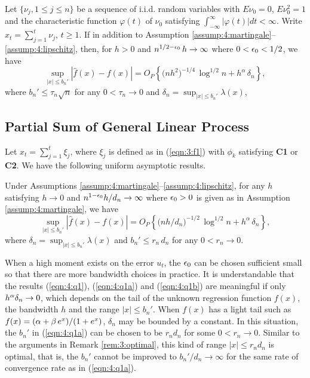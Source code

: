 \begin{cor} 
Let  $\{\nu_{j}, 1 \le j\le n \}$ be a sequence of i.i.d.
random variables with $E\nu_{0}=0$, $E\nu _{0}^{2}=1$ and the
characteristic function $\varphi (t)$ of $\nu_{0}$ satisfying
$\int_{-\infty }^{\infty }|\varphi (t)|dt<\infty $. Write $x_t=\sum_{j=1}^t\nu_j$, $t\ge 1$. If in addition to Assumption \ref{assump:4:martingale}--\ref{assump:4:lipschitz}, then,  for  $h> 0$  and $n^{1/2-\epsilon_0}\, h\to \infty$ where $0<\epsilon_0<1/2$, we have
\begin{equation}
\sup_{|x|\le b_n'}|\widehat{f}(x)-f(x)|=
O_{P}\left\{\big(nh^{2}\big)^{-1/4}\,\log^{1/2}n
+h^{\alpha}\, \delta_n\right\},
\label{eqn:4:q1a}\end{equation}
where $b_n'\le \tau_n\sqrt n$ for any $0<\tau_n\to 0$ and $\delta_n=\sup_{|x|\le b_n'}\lambda(x)$,  

\end{cor}

\subsection{Partial Sum of General Linear Process}

Let $x_t=\sum_{j=1}^t\xi_j$, where $\xi_j$ is defined as in (\ref {eqn:3:f1}) with $\phi_k$ satisfying {\bf C1} or {\bf C2}. We have the following uniform asymptotic results.

\begin{thm}  Under Assumptions \ref{assump:4:martingale}--\ref{assump:4:lipschitz},
for any $h$ satisfying $h\to 0$ and $n^{1-\epsilon_0}h/d_n\to \infty$ where $\epsilon_0>0$ is given as in Assumption \ref{assump:4:martingale}, we have
\begin{equation}
\sup_{|x|\le b_n'}|\widehat{f}(x)-f(x)|=
O_{P}\left\{\big(nh/d_n\big)^{-1/2}\,\log^{1/2}n
+h^{\alpha}\, \delta_n\right\},
\label{eqn:4:q1b}\end{equation}
where $\delta_n=\sup_{|x|\le b_n'}\lambda(x)$ and $b_n'\le r_n\,d_n $ for any  $0< r_n \to 0$.
\end{thm}


\begin{rem} When a high moment exists on the error $u_t$,
the $\epsilon_0$ can be chosen sufficient small so that there are more bandwidth choices  in practice. It is understandable that the results (\ref {eqn:4:q1}), (\ref {eqn:4:q1a}) and (\ref {eqn:4:q1b}) are meaningful if only $h^{\alpha}\delta_n\to 0$, which depends on the tail of the unknown regression function $f(x)$, the bandwidth $h$ and the range $|x|\le b_n'$.
When $f(x)$ has a light tail such as $f(x)=(\alpha+\beta\, e^{x})/(1+e^x)$, $\delta_n$ may be bounded by a constant. In this situation, the $b_n'$ in (\ref {eqn:4:q1a}) can be chosen to be $r_n d_n$ for some $0<r_n\to 0$. Similar to the arguments in Remark \ref{rem:3:optimal}, this kind of range $|x|\le r_n d_n$ is optimal, that is, the $b_n'$ cannot be improved  to $b_n' / d_n \to \infty$ for the same rate of convergence rate as in (\ref {eqn:4:q1a}).
\end{rem}

